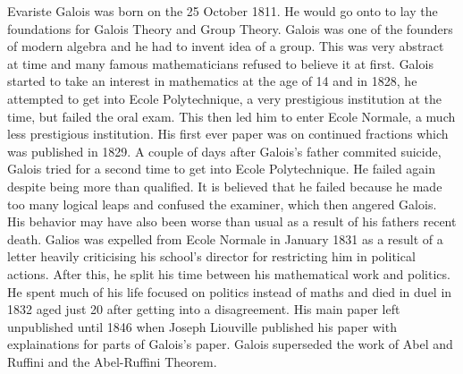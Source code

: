 Evariste Galois was born on the 25 October 1811. He would go onto to lay the foundations for Galois Theory and Group Theory. Galois was one of the founders of modern algebra and he had to invent idea of a group. This was very abstract at time and many famous mathematicians refused to believe it at first. Galois started to take an interest in mathematics at the age of 14 and in 1828, he attempted to get into Ecole Polytechnique, a very prestigious institution at the time, but failed the oral exam. This then led him to enter Ecole Normale, a much less prestigious institution. His first ever paper was on continued fractions which was published in 1829. A couple of days after Galois's father commited suicide, Galois tried for a second time to get into Ecole Polytechnique. He failed again despite being more than qualified. It is believed that he failed because he made too many logical leaps and confused the examiner, which then angered Galois. His behavior may have also been worse than usual as a result of his fathers recent death. Galios was expelled from Ecole Normale in January 1831 as a result of a letter heavily criticising his school's director for restricting him in political actions. After this, he split his time between his mathematical work and politics. He spent much of his life focused on politics instead of maths and died in duel in 1832 aged just 20 after getting into a disagreement. His main paper left unpublished until 1846 when Joseph Liouville published his paper with explainations for parts of Galois's paper. Galois superseded the work of Abel and Ruffini and the Abel-Ruffini Theorem.